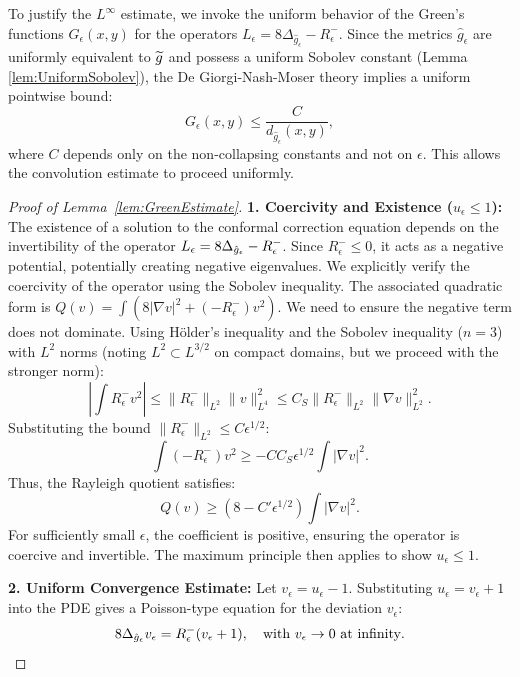 \begin{lemma}
To justify the $L^\infty$ estimate, we invoke the uniform behavior of the Green's functions $G_\epsilon(x,y)$ for the operators $L_\epsilon = 8\Delta_{\hat{g}_\epsilon} - R^-_\epsilon$. Since the metrics $\hat{g}_\epsilon$ are uniformly equivalent to $\widetilde{g}$ and possess a uniform Sobolev constant (Lemma \ref{lem:UniformSobolev}), the De Giorgi-Nash-Moser theory implies a uniform pointwise bound:
\[ G_\epsilon(x,y) \le \frac{C}{d_{\hat{g}_\epsilon}(x,y)}, \]
where $C$ depends only on the non-collapsing constants and not on $\epsilon$. This allows the convolution estimate to proceed uniformly.
\end{lemma}

\begin{proof}[Proof of Lemma~\ref{lem:GreenEstimate}]
\textbf{1. Coercivity and Existence ($u_\epsilon \le 1$):}
The existence of a solution to the conformal correction equation depends on the invertibility of the operator $L_\epsilon = 8\Delta_{\hat{g}_\epsilon} - R^-_\epsilon$. Since $R^-_\epsilon \le 0$, it acts as a negative potential, potentially creating negative eigenvalues. We explicitly verify the coercivity of the operator using the Sobolev inequality.
The associated quadratic form is $Q(v) = \int (8|\nabla v|^2 + (-R^-_\epsilon)v^2)$. We need to ensure the negative term does not dominate.
Using H\"older's inequality and the Sobolev inequality ($n=3$) with $L^2$ norms (noting $L^2 \subset L^{3/2}$ on compact domains, but we proceed with the stronger norm):
\[ \left| \int R^-_\epsilon v^2 \right| \le \|R^-_\epsilon\|_{L^{2}} \|v\|_{L^4}^2 \le C_S \|R^-_\epsilon\|_{L^{2}} \|\nabla v\|_{L^2}^2. \]
Substituting the bound $\|R^-_\epsilon\|_{L^{2}} \le C \epsilon^{1/2}$:
\[ \int (-R^-_\epsilon)v^2 \ge - C C_S \epsilon^{1/2} \int |\nabla v|^2. \]
Thus, the Rayleigh quotient satisfies:
\[ Q(v) \ge (8 - C' \epsilon^{1/2}) \int |\nabla v|^2. \]
For sufficiently small $\epsilon$, the coefficient is positive, ensuring the operator is coercive and invertible. The maximum principle then applies to show $u_\epsilon \le 1$.

\textbf{2. Uniform Convergence Estimate:}
Let $v_\epsilon = u_\epsilon - 1$. Substituting $u_\epsilon = v_\epsilon + 1$ into the PDE gives a Poisson-type equation for the deviation $v_\epsilon$:
\[ 8\Delta_{\hat{g}_\epsilon} v_\epsilon = R^-_\epsilon (v_\epsilon + 1), \quad \text{with } v_\epsilon \to 0 \text{ at infinity}. \]


\end{proof}
